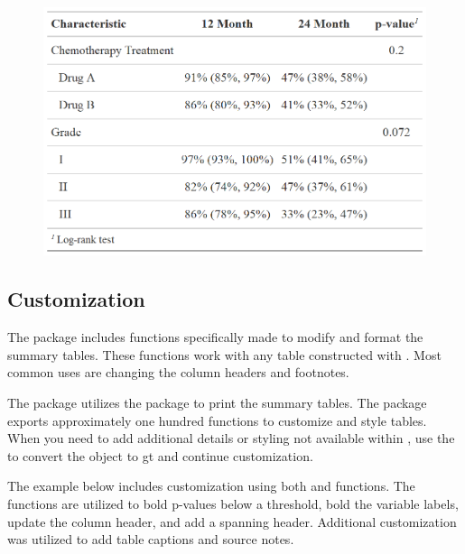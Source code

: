 \begin{figure}[h!]
  \includegraphics[scale=0.35]{survfit.png}
  \centering
\end{figure}

\subsection{Customization}

The  package includes functions specifically made to modify and format the summary tables.
These functions work with any table constructed with .
Most common uses are changing the column headers and footnotes.



The  package utilizes the  package to print the summary tables.
The  package exports approximately one hundred functions to customize and style tables.
When you need to add additional details or styling not available within , use the  to convert the  object to gt and continue customization.

The example below includes customization using both  and  functions.
The  functions are utilized to bold p-values below a threshold, bold the variable labels,  update the column header, and add a spanning header.
Additional  customization was utilized to add table captions and source notes.

